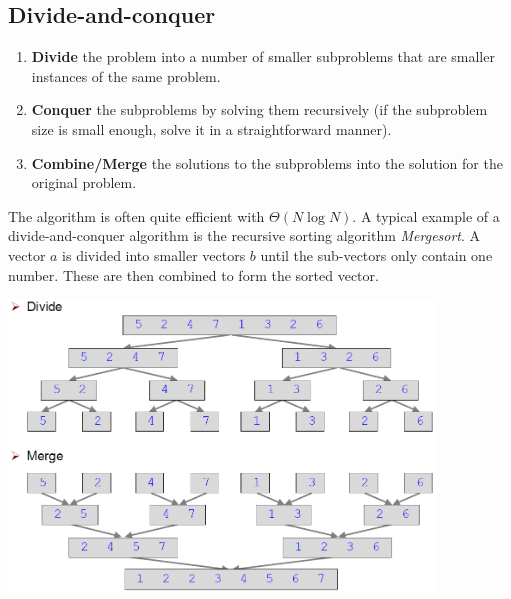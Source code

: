 %

\subsection{Divide-and-conquer}

\begin{enumerate}
    \item \textbf{Divide} the problem into a number of smaller subproblems that are smaller instances of the same problem.
    \item \textbf{Conquer} the subproblems by solving them recursively (if the subproblem size is small enough, solve it in a straightforward manner).
    \item \textbf{Combine/Merge} the solutions to the subproblems into the solution for the original problem.
\end{enumerate}

The algorithm is often quite efficient with $\Theta(N\log N)$. A typical example of a divide-and-conquer algorithm is the recursive sorting algorithm \emph{Mergesort}. A vector $a$ is divided into smaller vectors $b$ until the sub-vectors only contain one number. These are then combined to form the sorted vector.

\begin{center}\includegraphics[width=0.85\textwidth]{img/algorithms/DivideConquerMergesort.png}\end{center}

%

